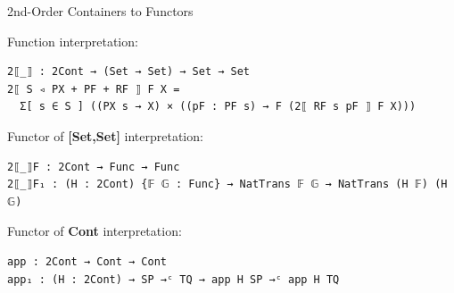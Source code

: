 \documentclass{beamer}
\begin{document}
\begin{frame}[fragile]{2nd-Order Containers to Functors}

Function interpretation:

\begin{exampleblock}{}
\begin{verbatim}
2⟦_⟧ : 2Cont → (Set → Set) → Set → Set
2⟦ S ◃ PX + PF + RF ⟧ F X = 
  Σ[ s ∈ S ] ((PX s → X) × ((pF : PF s) → F (2⟦ RF s pF ⟧ F X)))
\end{verbatim}
\end{exampleblock}

Functor of \textbf{[Set,Set]} interpretation:

\begin{exampleblock}{}
\begin{verbatim}
2⟦_⟧F : 2Cont → Func → Func
2⟦_⟧F₁ : (H : 2Cont) {𝔽 𝔾 : Func} → NatTrans 𝔽 𝔾 → NatTrans (H 𝔽) (H 𝔾)
\end{verbatim}
\end{exampleblock}

\pause
Functor of \textbf{Cont} interpretation:

\begin{exampleblock}{}
\begin{verbatim}
app : 2Cont → Cont → Cont
app₁ : (H : 2Cont) → SP →ᶜ TQ → app H SP →ᶜ app H TQ
\end{verbatim}
\end{exampleblock}
\end{frame}
\end{document}
